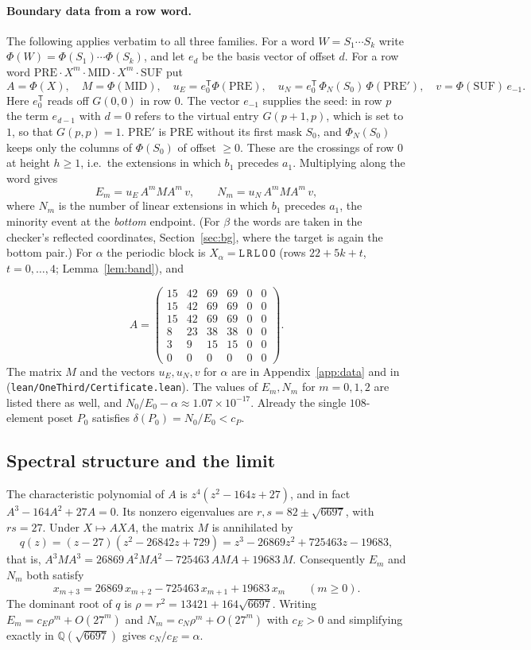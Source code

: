 \documentclass[11pt]{amsart}
\theoremstyle{definition}
\theoremstyle{remark}
\newcommand{\mk}[1]{\mathtt{#1}}
\begin{document}
\paragraph{Boundary data from a row word.} The following applies verbatim to all three families. For a word $W=S_1\cdots S_k$ write $\Phi(W)=\Phi(S_1)\cdots\Phi(S_k)$, and let $e_d$ be the basis vector of offset $d$. For a row word $\mathrm{PRE}\cdot X^m\cdot\mathrm{MID}\cdot X^m\cdot\mathrm{SUF}$ put
\[
A=\Phi(X),\quad M=\Phi(\mathrm{MID}),\quad u_E=e_0^{\mathsf T}\Phi(\mathrm{PRE}),\quad u_N=e_0^{\mathsf T}\,\Phi_N(S_0)\,\Phi(\mathrm{PRE}'),\quad v=\Phi(\mathrm{SUF})\,e_{-1}.
\]
Here $e_0^{\mathsf T}$ reads off $G(0,0)$ in row $0$. The vector $e_{-1}$ supplies the seed: in row $p$ the term $e_{d-1}$ with $d=0$ refers to the virtual entry $G(p+1,p)$, which is set to $1$, so that $G(p,p)=1$. $\mathrm{PRE}'$ is $\mathrm{PRE}$ without its first mask $S_0$, and $\Phi_N(S_0)$ keeps only the columns of $\Phi(S_0)$ of offset $\ge0$. These are the crossings of row $0$ at height $h\ge1$, i.e.\ the extensions in which $b_1$ precedes $a_1$. Multiplying along the word gives
\[
E_m=u_E\,A^m M A^m\,v,\qquad N_m=u_N\,A^m M A^m\,v,
\]
where $N_m$ is the number of linear extensions in which $b_1$ precedes $a_1$, the minority event at the \emph{bottom} endpoint. (For $\beta$ the words are taken in the checker's reflected coordinates, Section~\ref{sec:bg}, where the target is again the bottom pair.) For $\alpha$ the periodic block is $X_\alpha=\mk{L}\,\mk{R}\,\mk{L}\,\mk{O}\,\mk{O}$ (rows $22+5k+t$, $t=0,\dots,4$; Lemma~\ref{lem:band}), and

\[
A=\begin{pmatrix}
15&42&69&69&0&0\\ 15&42&69&69&0&0\\ 15&42&69&69&0&0\\ 8&23&38&38&0&0\\ 3&9&15&15&0&0\\ 0&0&0&0&0&0
\end{pmatrix}.
\]
The matrix $M$ and the vectors $u_E,u_N,v$ for $\alpha$ are in Appendix~\ref{app:data} and in~\cite{repo} (\texttt{lean/OneThird/Certificate.lean}). The values of $E_m,N_m$ for $m=0,1,2$ are listed there as well, and $N_0/E_0-\alpha\approx1.07\times10^{-17}$. Already the single $108$-element poset $P_0$ satisfies $\delta(P_0)=N_0/E_0<c_P$.

\subsection*{Spectral structure and the limit}
The characteristic polynomial of $A$ is $z^4(z^2-164z+27)$, and in fact $A^3-164A^2+27A=0$. Its nonzero eigenvalues are $r,s=82\pm\sqrt{6697}$, with $rs=27$. Under $X\mapsto AXA$, the matrix $M$ is annihilated by
\[
q(z)=(z-27)(z^2-26842z+729)=z^3-26869z^2+725463z-19683 ,
\]
that is, $A^3MA^3=26869\,A^2MA^2-725463\,AMA+19683\,M$. Consequently $E_m$ and $N_m$ both satisfy
\[
x_{m+3}=26869\,x_{m+2}-725463\,x_{m+1}+19683\,x_m\qquad(m\ge0).
\]
The dominant root of $q$ is $\rho=r^2=13421+164\sqrt{6697}$. Writing $E_m=c_E\rho^m+O(27^m)$ and $N_m=c_N\rho^m+O(27^m)$ with $c_E>0$ and simplifying exactly in $\mathbb{Q}(\sqrt{6697})$ gives $c_N/c_E=\alpha$.
\end{document}
